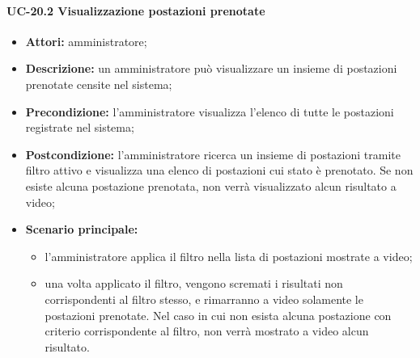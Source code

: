 \paragraph{UC-20.2 Visualizzazione postazioni prenotate}
\begin{itemize}
    \item \textbf{Attori:} amministratore;
    \item \textbf{Descrizione:} un amministratore pu\`{o} visualizzare un insieme di postazioni prenotate censite nel sistema;
    \item \textbf{Precondizione:} l'amministratore visualizza l'elenco di tutte le postazioni registrate nel sistema;
    \item \textbf{Postcondizione:} l'amministratore ricerca un insieme di postazioni tramite filtro attivo e visualizza una elenco di postazioni cui stato è prenotato. Se non esiste alcuna postazione prenotata, non verrà visualizzato alcun risultato a video;
    \item \textbf{Scenario principale:}
    \begin{itemize}
        \item l'amministratore applica il filtro nella lista di postazioni mostrate a video;
        \item una volta applicato il filtro, vengono scremati i risultati non corrispondenti al filtro stesso, e rimarranno a video solamente le postazioni prenotate. Nel caso in cui non esista alcuna postazione con criterio corrispondente al filtro, non verrà mostrato a video alcun risultato.
    \end{itemize}
\end{itemize}


